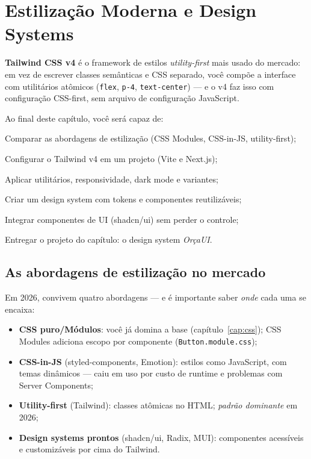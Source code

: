 \chapter{Estilização Moderna e Design Systems}
\label{cap:estilizacao}

\begin{caixaconceito}
\textbf{Tailwind CSS v4} \cite{tailwindv4} é o framework de estilos
\emph{utility-first} mais usado do mercado: em vez de escrever classes
semânticas e CSS separado, você compõe a interface com utilitários atômicos
(\texttt{flex}, \texttt{p-4}, \texttt{text-center}) — e o v4 faz isso com
configuração CSS-first, sem arquivo de configuração JavaScript.
\end{caixaconceito}

Ao final deste capítulo, você será capaz de:
\begin{objetivos}
  \item Comparar as abordagens de estilização (CSS Modules, CSS-in-JS, utility-first);
  \item Configurar o Tailwind v4 em um projeto (Vite e Next.js);
  \item Aplicar utilitários, responsividade, dark mode e variantes;
  \item Criar um design system com tokens e componentes reutilizáveis;
  \item Integrar componentes de UI (shadcn/ui) sem perder o controle;
  \item Entregar o projeto do capítulo: o design system \emph{OrçaUI}.
\end{objetivos}

\section{As abordagens de estilização no mercado}

Em 2026, convivem quatro abordagens — e é importante saber \emph{onde} cada
uma se encaixa:

\begin{itemize}[leftmargin=*, itemsep=0.4em]
  \item \textbf{CSS puro/Módulos}: você já domina a base (capítulo~\ref{cap:css});
  CSS Modules adiciona escopo por componente (\texttt{Button.module.css});
  \item \textbf{CSS-in-JS} (styled-components, Emotion): estilos como
  JavaScript, com temas dinâmicos — caiu em uso por custo de runtime e
  problemas com Server Components;
  \item \textbf{Utility-first} (Tailwind): classes atômicas no HTML;
  \emph{padrão dominante} em 2026;
  \item \textbf{Design systems prontos} (shadcn/ui, Radix, MUI): componentes
  acessíveis e customizáveis por cima do Tailwind.
\end{itemize}

